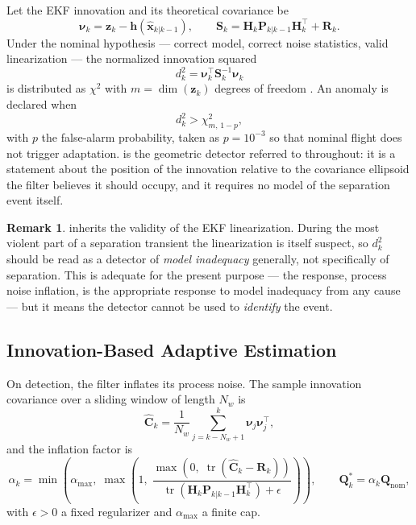 \documentclass[11pt,a4paper]{article}
\theoremstyle{definition}
\newtheorem{remark}[theorem]{Remark}
\numberwithin{equation}{section}
\newcommand{\tr}{\operatorname{tr}}
\begin{document}
Let the EKF innovation and its theoretical covariance be
\begin{equation}
\label{eq:innov}
\bm{\nu}_k = \mathbf{z}_k - \mathbf{h}(\hat{\mathbf{x}}_{k|k-1}),
\qquad
\mathbf{S}_k = \mathbf{H}_k \mathbf{P}_{k|k-1} \mathbf{H}_k^{\!\top} + \mathbf{R}_k .
\end{equation}
Under the nominal hypothesis --- correct model, correct noise statistics, valid linearization --- the normalized innovation squared
\begin{equation}
\label{eq:nis}
d_k^2 = \bm{\nu}_k^{\!\top} \mathbf{S}_k^{-1} \bm{\nu}_k
\end{equation}
is distributed as $\chi^2$ with $m = \dim(\mathbf{z}_k)$ degrees of freedom \cite{barshalom2001}. An anomaly is declared when
\begin{equation}
\label{eq:gate}
d_k^2 > \chi^2_{m,\,1-p},
\end{equation}
with $p$ the false-alarm probability, taken as $p = 10^{-3}$ so that nominal flight does not trigger adaptation.  is the geometric detector referred to throughout: it is a statement about the position of the innovation relative to the covariance ellipsoid the filter believes it should occupy, and it requires no model of the separation event itself.

\begin{remark}
 inherits the validity of the EKF linearization. During the most violent part of a separation transient the linearization is itself suspect, so $d_k^2$ should be read as a detector of \emph{model inadequacy} generally, not specifically of separation. This is adequate for the present purpose --- the response, process noise inflation, is the appropriate response to model inadequacy from any cause --- but it means the detector cannot be used to \emph{identify} the event.
\end{remark}

\subsection{Innovation-Based Adaptive Estimation}
\label{sec:iae}

On detection, the filter inflates its process noise. The sample innovation covariance over a sliding window of length $N_w$ is
\begin{equation}
\label{eq:samplecov}
\hat{\mathbf{C}}_k = \frac{1}{N_w} \sum_{j = k - N_w + 1}^{k} \bm{\nu}_j \bm{\nu}_j^{\!\top},
\end{equation}
and the inflation factor is
\begin{equation}
\label{eq:alpha}
\alpha_k = \min\!\left( \alpha_{\max},\;
\max\!\left(1, \; \frac{\max\!\left(0, \; \tr(\hat{\mathbf{C}}_k - \mathbf{R}_k)\right)}{\tr\!\left(\mathbf{H}_k \mathbf{P}_{k|k-1}\mathbf{H}_k^{\!\top}\right) + \epsilon} \right) \right),
\qquad
\mathbf{Q}_k^* = \alpha_k \mathbf{Q}_{\text{nom}},
\end{equation}
with $\epsilon > 0$ a fixed regularizer and $\alpha_{\max}$ a finite cap.
\end{document}
